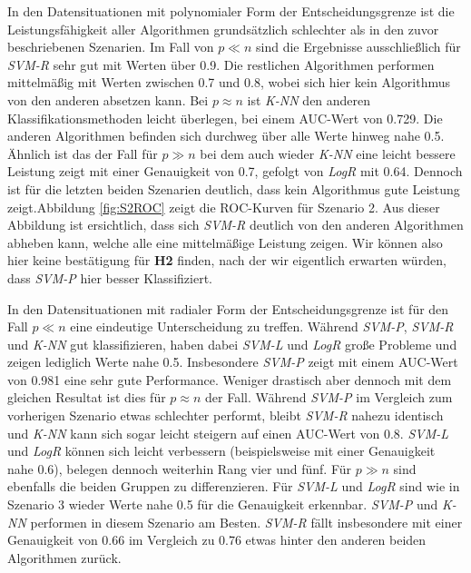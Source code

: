 \documentclass[
]{article}
\begin{document}
In den Datensituationen mit polynomialer Form der Entscheidungsgrenze
ist die Leistungsfähigkeit aller Algorithmen grundsätzlich schlechter
als in den zuvor beschriebenen Szenarien. Im Fall von \(p \ll n\) sind
die Ergebnisse ausschließlich für \textit{SVM-R} sehr gut mit Werten
über 0.9. Die restlichen Algorithmen performen mittelmäßig mit Werten
zwischen 0.7 und 0.8, wobei sich hier kein Algorithmus von den anderen
absetzen kann. Bei \(p \approx n\) ist \textit{K-NN} den anderen
Klassifikationsmethoden leicht überlegen, bei einem AUC-Wert von 0.729.
Die anderen Algorithmen befinden sich durchweg über alle Werte hinweg
nahe 0.5. Ähnlich ist das der Fall für \(p \gg n\) bei dem auch wieder
\textit{K-NN} eine leicht bessere Leistung zeigt mit einer Genauigkeit
von 0.7, gefolgt von \textit{LogR} mit 0.64. Dennoch ist für die letzten
beiden Szenarien deutlich, dass kein Algorithmus gute Leistung
zeigt.\newline Abbildung \ref{fig:S2ROC} zeigt die ROC-Kurven für
Szenario 2. Aus dieser Abbildung ist ersichtlich, dass sich
\textit{SVM-R} deutlich von den anderen Algorithmen abheben kann, welche
alle eine mittelmäßige Leistung zeigen. Wir können also hier keine
bestätigung für \textbf{H2} finden, nach der wir eigentlich erwarten
würden, dass \textit{SVM-P} hier besser Klassifiziert.

In den Datensituationen mit radialer Form der Entscheidungsgrenze ist
für den Fall \(p \ll n\) eine eindeutige Unterscheidung zu treffen.
Während \textit{SVM-P}, \textit{SVM-R} und \textit{K-NN} gut
klassifizieren, haben dabei \textit{SVM-L} und \textit{LogR} große
Probleme und zeigen lediglich Werte nahe 0.5. Insbesondere
\textit{SVM-P} zeigt mit einem AUC-Wert von 0.981 eine sehr gute
Performance. Weniger drastisch aber dennoch mit dem gleichen Resultat
ist dies für \(p \approx n\) der Fall. Während \textit{SVM-P} im
Vergleich zum vorherigen Szenario etwas schlechter performt, bleibt
\textit{SVM-R} nahezu identisch und \textit{K-NN} kann sich sogar leicht
steigern auf einen AUC-Wert von 0.8. \textit{SVM-L} und \textit{LogR}
können sich leicht verbessern (beispielsweise mit einer Genauigkeit nahe
0.6), belegen dennoch weiterhin Rang vier und fünf. Für \(p \gg n\) sind
ebenfalls die beiden Gruppen zu differenzieren. Für \textit{SVM-L} und
\textit{LogR} sind wie in Szenario 3 wieder Werte nahe 0.5 für die
Genauigkeit erkennbar. \textit{SVM-P} und \textit{K-NN} performen in
diesem Szenario am Besten. \textit{SVM-R} fällt insbesondere mit einer
Genauigkeit von 0.66 im Vergleich zu 0.76 etwas hinter den anderen
beiden Algorithmen zurück.\newline
\end{document}
